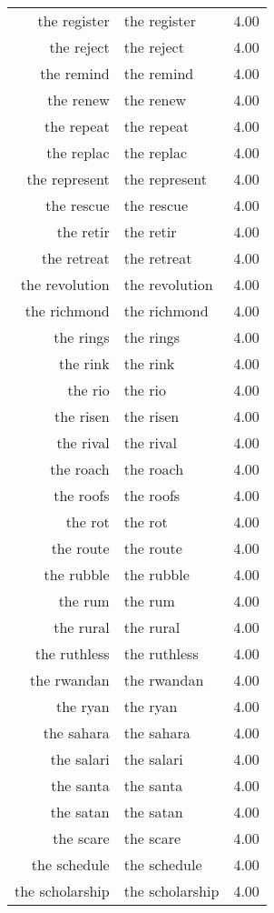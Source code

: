 \begin{table}[ht]
\begin{tabular}{rlr}
  the register & the register & 4.00 \\ 
  the reject & the reject & 4.00 \\ 
  the remind & the remind & 4.00 \\ 
  the renew & the renew & 4.00 \\ 
  the repeat & the repeat & 4.00 \\ 
  the replac & the replac & 4.00 \\ 
  the represent & the represent & 4.00 \\ 
  the rescue & the rescue & 4.00 \\ 
  the retir & the retir & 4.00 \\ 
  the retreat & the retreat & 4.00 \\ 
  the revolution & the revolution & 4.00 \\ 
  the richmond & the richmond & 4.00 \\ 
  the rings & the rings & 4.00 \\ 
  the rink & the rink & 4.00 \\ 
  the rio & the rio & 4.00 \\ 
  the risen & the risen & 4.00 \\ 
  the rival & the rival & 4.00 \\ 
  the roach & the roach & 4.00 \\ 
  the roofs & the roofs & 4.00 \\ 
  the rot & the rot & 4.00 \\ 
  the route & the route & 4.00 \\ 
  the rubble & the rubble & 4.00 \\ 
  the rum & the rum & 4.00 \\ 
  the rural & the rural & 4.00 \\ 
  the ruthless & the ruthless & 4.00 \\ 
  the rwandan & the rwandan & 4.00 \\ 
  the ryan & the ryan & 4.00 \\ 
  the sahara & the sahara & 4.00 \\ 
  the salari & the salari & 4.00 \\ 
  the santa & the santa & 4.00 \\ 
  the satan & the satan & 4.00 \\ 
  the scare & the scare & 4.00 \\ 
  the schedule & the schedule & 4.00 \\ 
  the scholarship & the scholarship & 4.00 \\ 

\end{tabular}
\end{table}
